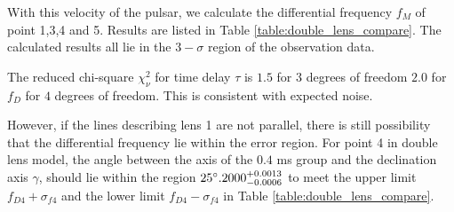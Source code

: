 \documentclass[useAMS,usenatbib]{mn2e}
\begin{document}


With this velocity of the pulsar, we calculate the differential frequency $f_M$ of point 1,3,4 and 5. Results are listed in Table \ref{table:double_lens_compare}. The calculated results all lie in the $3-\sigma$ region of the observation data. 

The reduced chi-square ${\chi}^2_{\nu}$ for time delay $\tau$ is $1.5$
for $3$ degrees of freedom
 $2.0$ for $f_D$ for $4$ degrees of freedom.  This is consistent with
 expected noise.

However, if the lines describing lens 1 are not parallel, there is still possibility that the differential frequency lie within the error region. For point 4 in double lens model, the angle between the axis of the $0.4$ ms group and the declination axis $\gamma$, should lie within the region 
$\-25\degree.2000^{+0.0013}_{-0.0006} $ to meet the upper limit $f_{D4}+\sigma_{f4}$ and the lower limit $f_{D4}-\sigma_{f4}$ in Table \ref{table:double_lens_compare}.
\end{document}
